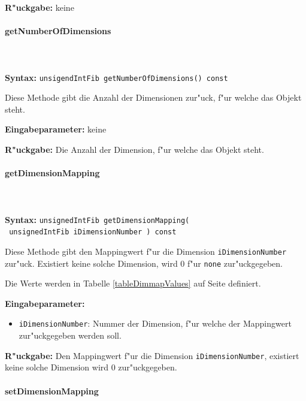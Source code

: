 \bigskip\noindent
\textbf{R"uckgabe:} keine


\paragraph{getNumberOfDimensions}

\ \\\\\noindent
\textbf{Syntax:} \verb|unsigendIntFib getNumberOfDimensions() const|

\bigskip\noindent
Diese Methode gibt die Anzahl der Dimensionen zur"uck, f"ur welche das Objekt steht.

\bigskip\noindent
\textbf{Eingabeparameter:} keine

\bigskip\noindent
\textbf{R"uckgabe:} Die Anzahl der Dimension, f"ur welche das Objekt steht.


\paragraph{getDimensionMapping}

\ \\\\\noindent
\textbf{Syntax:} \verb|unsignedIntFib getDimensionMapping(| \\\verb| unsignedIntFib iDimensionNumber ) const|

\bigskip\noindent
Diese Methode gibt den Mappingwert f"ur die Dimension \verb|iDimensionNumber| zur"uck. Existiert keine solche Dimension, wird $0$ f"ur \verb|none| zur"uckgegeben.

Die Werte werden in Tabelle \ref{tableDimmapValues} auf Seite \pageref{tableDimmapValues} definiert.

\bigskip\noindent
\textbf{Eingabeparameter:}
\begin{itemize}
 \item \verb|iDimensionNumber|: Nummer der Dimension, f"ur welche der Mappingwert zur"uckgegeben werden soll.
\end{itemize}

\bigskip\noindent
\textbf{R"uckgabe:} Den Mappingwert f"ur die Dimension \verb|iDimensionNumber|, existiert keine solche Dimension wird $0$ zur"uckgegeben.


\paragraph{setDimensionMapping}

